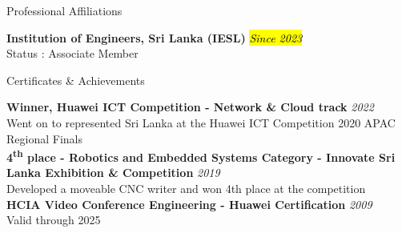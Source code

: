\documentclass[
	11pt, %
]{./assets/resume} %
\begin{document}







\begin{rSection}{Professional Affiliations}

	\textbf{Institution of Engineers, Sri Lanka (IESL)} \hfill \hl{\textit{Since 2023}} \\ 
	Status : Associate Member %


\end{rSection}


\begin{rSection}{Certificates \& Achievements}

	\textbf{Winner, Huawei ICT Competition - Network \& Cloud track} \hfill \textit{2022} \\ 
	Went on to represented Sri Lanka at the Huawei ICT Competition 2020 APAC Regional Finals \\
	
	\textbf{4\textsuperscript{th} place - Robotics and Embedded Systems Category - Innovate Sri Lanka Exhibition \& Competition} \hfill \textit{2019} \\ 
	Developed a moveable CNC writer and won 4th place at the competition \\

	\textbf{HCIA Video Conference Engineering - Huawei Certification} \hfill \textit{2009} \\ 
	Valid through 2025

\end{rSection}
\end{document}
